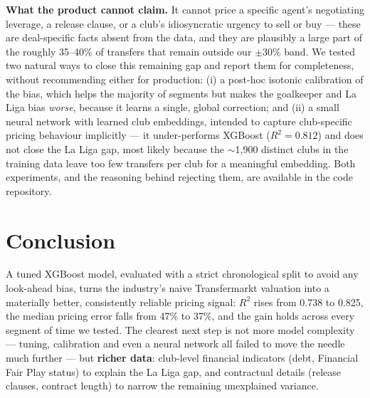 \documentclass[11pt]{article}
\begin{document}
\textbf{What the product cannot claim.} It cannot price a specific agent's
negotiating leverage, a release clause, or a club's idiosyncratic urgency to
sell or buy --- these are deal-specific facts absent from the data, and they
are plausibly a large part of the roughly 35--40\% of transfers that remain
outside our $\pm 30\%$ band. We tested two natural ways to close this
remaining gap and report them for completeness, without recommending either
for production: (i) a post-hoc isotonic calibration of the bias, which helps
the majority of segments but makes the goalkeeper and La Liga bias \emph{worse},
because it learns a single, global correction; and (ii) a small neural
network with learned club embeddings, intended to capture club-specific
pricing behaviour implicitly --- it under-performs XGBoost ($R^2=0.812$) and
does not close the La Liga gap, most likely because the $\sim$1{,}900
distinct clubs in the training data leave too few transfers per club for a
meaningful embedding. Both experiments, and the reasoning behind rejecting
them, are available in the code repository.

\section*{Conclusion}
A tuned XGBoost model, evaluated with a strict chronological split to avoid
any look-ahead bias, turns the industry's naive Transfermarkt valuation into
a materially better, consistently reliable pricing signal: $R^2$ rises from
0.738 to 0.825, the median pricing error falls from 47\% to 37\%, and the
gain holds across every segment of time we tested. The clearest next step is
not more model complexity --- tuning, calibration and even a neural network
all failed to move the needle much further --- but \textbf{richer data}:
club-level financial indicators (debt, Financial Fair Play status) to
explain the La Liga gap, and contractual details (release clauses, contract
length) to narrow the remaining unexplained variance.
\end{document}

